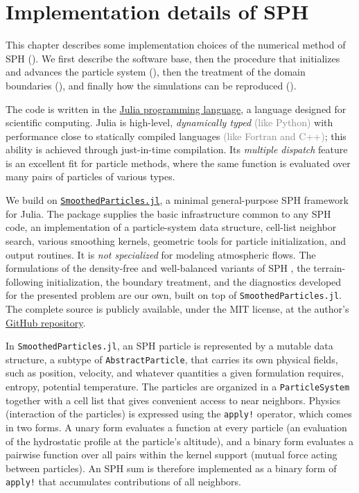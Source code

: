 \documentclass[../main.tex]{subfiles}
\begin{document}
\chapter{Implementation details of SPH}
\label{chap:IMPLEMENTATION}

This chapter describes some implementation choices of the numerical method of SPH (). We first describe the software base, then the procedure that initializes and advances the particle system (), then the treatment of the domain boundaries (), and finally how the simulations can be reproduced ().

The code is written in the \href{https://julialang.org/}{Julia programming language}, a language designed for scientific computing. Julia is high-level, \emph{dynamically typed} \textcolor{gray}{(like Python)} with performance close to statically compiled languages \textcolor{gray}{(like Fortran and C++)}; this ability is achieved through just-in-time compilation. Its \emph{multiple dispatch} feature is an excellent fit for particle methods, where the same function is evaluated over many pairs of particles of various types.

We build on \href{https://github.com/OndrejKincl/SmoothedParticles.jl}{\texttt{SmoothedParticles.jl}}\autocite{kinclGloballyTimereversibleFluid2023a,kinclSimulationSuperfluidFountain2023a,kinclUnifiedDescriptionFluids2023a}, a minimal general-purpose SPH framework for Julia. The package supplies the basic infrastructure common to any SPH code, \ie an implementation of a particle-system data structure, cell-list neighbor search, various smoothing kernels, geometric tools for particle initialization, and output routines. It is \emph{not specialized} for modeling atmospheric flows.
The formulations of the density-free and well-balanced variants of SPH , the terrain-following initialization, the boundary treatment, and the diagnostics developed for the presented problem are our own, built on top of \texttt{SmoothedParticles.jl}. The complete source is publicly available, under the MIT license, at the author's \href{https://github.com/kamilbelan/sph-mountain-waves}{GitHub repository}.

In \texttt{SmoothedParticles.jl}, an SPH particle is represented by  a mutable data structure, a subtype of \texttt{AbstractParticle}, that carries its own physical fields, such as position, velocity, and whatever quantities a given formulation requires, \eg entropy, potential temperature. The particles are organized in a \texttt{ParticleSystem} together with a cell list that gives convenient access to near neighbors.
Physics (interaction of the particles) is expressed using the \texttt{apply!} operator, which comes in two forms. A unary form evaluates a function at every particle (\eg an evaluation of the hydrostatic profile at the particle's altitude), and a binary form evaluates a pairwise function over all pairs within the kernel support (\eg mutual force acting between particles). An SPH sum is therefore implemented as a binary form of \texttt{apply!} that accumulates contributions of all neighbors. 
\end{document}
